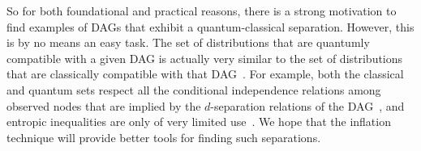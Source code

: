 \documentclass[aps,english,superscriptaddress,onecolumn,twoside,longbibliography,pra,floatfix,fleqn,nofootinbib]{revtex4-1}%
\newcommand*{\tblue}[1]{{\color{MidnightBlue}{\textbf{#1}}}}
\theoremstyle{definition}
\begin{document}

So for both foundational and practical reasons, there is a strong motivation to find examples of DAGs that exhibit a quantum-classical separation.
However, this is by no means an easy task.
The set of distributions that are quantumly compatible with a given DAG is actually very similar to the set of distributions that are classically compatible with that DAG~\cite{pusey2014gdag,fritz2012bell}. For example, both the classical and quantum sets respect all the conditional independence relations among observed nodes that are implied by the $d$-separation relations of the DAG~\cite{pusey2014gdag}, and entropic inequalities are only of very limited use~\cite{chaves2012entropic,fritz2012bell}. We hope that the inflation technique will provide better tools for finding such separations.
\end{document}
